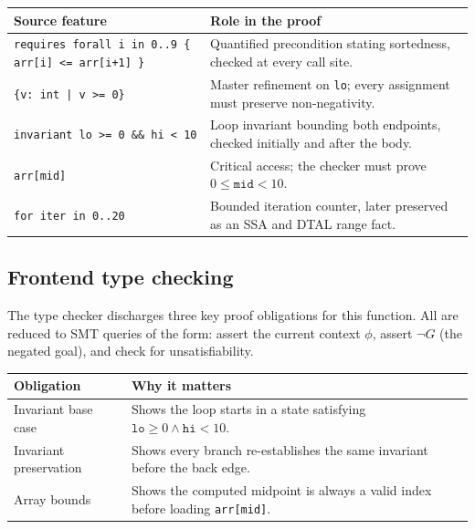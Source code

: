 \begin{center}
\small
\begin{tabularx}{0.96\textwidth}{>{\raggedright\arraybackslash}p{} >{\raggedright\arraybackslash}X}
\toprule
\textbf{Source feature} & \textbf{Role in the proof} \\
\midrule
\texttt{requires forall i in 0..9 \{ arr[i] <= arr[i+1] \}} & Quantified precondition stating sortedness, checked at every call site. \\
\texttt{\{v: int | v >= 0\}} & Master refinement on \texttt{lo}; every assignment must preserve non-negativity. \\
\texttt{invariant lo >= 0 \&\& hi < 10} & Loop invariant bounding both endpoints, checked initially and after the body. \\
\texttt{arr[mid]} & Critical access; the checker must prove $0 \le \mathtt{mid} < 10$. \\
\texttt{for iter in 0..20} & Bounded iteration counter, later preserved as an SSA and DTAL range fact. \\
\bottomrule
\end{tabularx}
\end{center}

\subsection{Frontend type checking}

The type checker discharges three key proof obligations for this function. All are reduced to SMT queries of the form: assert the current context $\phi$, assert $\lnot G$ (the negated goal), and check for unsatisfiability.

\begin{center}
\small
\begin{tabularx}{0.96\textwidth}{>{\raggedright\arraybackslash}p{} >{\raggedright\arraybackslash}X}
\toprule
\textbf{Obligation} & \textbf{Why it matters} \\
\midrule
Invariant base case & Shows the loop starts in a state satisfying $\mathtt{lo} \ge 0 \wedge \mathtt{hi} < 10$. \\
Invariant preservation & Shows every branch re-establishes the same invariant before the back edge. \\
Array bounds & Shows the computed midpoint is always a valid index before loading \texttt{arr[mid]}. \\
\bottomrule
\end{tabularx}
\end{center}

